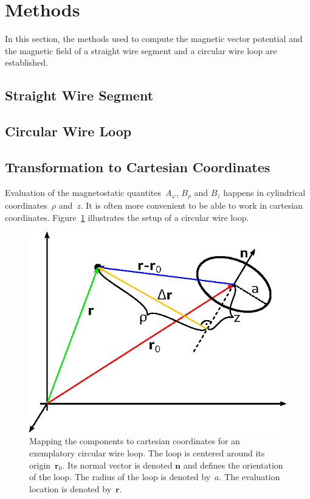 \section{Methods}
\label{sec:methods}
In this section, the methods used to compute the magnetic vector potential and the magnetic field
of a straight wire segment and a circular wire loop are established.


\subsection{Straight Wire Segment}


\subsection{Circular Wire Loop}





\subsection{Transformation to Cartesian Coordinates}
Evaluation of the magnetostatic quantites~$A_\varphi$, $B_\rho$ and $B_z$ happens in cylindrical coordinates~$\rho$ and~$z$.
It is often more convenient to be able to work in cartesian coordinates.
Figure~\ref{fig:mappingToCartesian} illustrates the setup of a circular wire loop.
\begin{figure}[htbp]
 \centering
 \includegraphics{img/MappingToCartesian.eps}
 \caption{Mapping the components to cartesian coordinates for an exemplatory circular wire loop.
          The loop is centered around its origin~$\mathbf{r}_0$.
          Its normal vector is denoted $\mathbf{n}$ and defines the orientation of the loop.
          The radius of the loop is denoted by~$a$.
          The evaluation location is denoted by~$\mathbf{r}$.}
 \label{fig:mappingToCartesian}
\end{figure}

